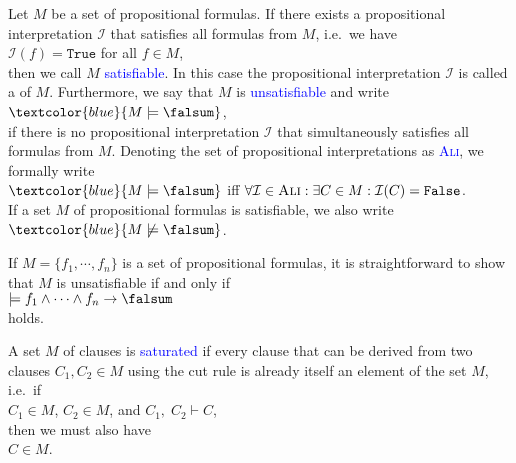 \begin{Definition}[Satisfiability]  \hspace*{\fill} \linebreak
  Let $M$ be a set of propositional formulas.
  If there exists a propositional interpretation $\mathcal{I}$ that satisfies all formulas from $M$, i.e.~we have
  \\[0.2cm]
  \hspace*{1.3cm}
  $\mathcal{I}(f) = \texttt{True}$ \quad for all $f \in M$,
  \\[0.2cm]
  then we call $M$ \textcolor{blue}{satisfiable}.  In this case the propositional
  interpretation $\mathcal{I}$ is called a  of $M$.
  Furthermore, we say that $M$ is \textcolor{blue}{unsatisfiable}
  and write 
  \\[0.2cm]
  \hspace*{1.3cm}
  $\textcolor{blue}{M \models \falsum}$, 
  \\[0.2cm]
  if there is no propositional interpretation $\mathcal{I}$ that simultaneously satisfies all formulas from $M$.
  Denoting the set of propositional interpretations as
  \textsc{\textcolor{blue}{Ali}}, we formally write
  \\[0.2cm]
  \hspace*{1.3cm}
  $\textcolor{blue}{M \models \falsum}$ \quad iff \quad 
  $\forall \mathcal{I} \in \textsc{Ali}: \exists C \in M: \mathcal{I}(C) = \texttt{False}$.
  \\[0.2cm]
  If a set $M$ of propositional formulas is satisfiable, we also write
  \\[0.2cm]
  \hspace*{1.3cm}
  $\textcolor{blue}{M \not\models \falsum}$.
  \eox
\end{Definition}

\remarkEng 
If $M = \{ f_1, \cdots, f_n \}$ is a set of propositional formulas, it is straightforward to show that
$M$ is unsatisfiable if and only if
\\[0.2cm]
\hspace*{1.3cm}
$\models f_1 \wedge \cdots \wedge f_n \rightarrow \falsum$
\\[0.2cm]
holds. \eox

\begin{Definition} \hspace*{\fill} \linebreak
  A set $M$ of clauses is \textcolor{blue}{saturated}  if every clause that can be derived from two
  clauses $C_1, C_2 \in M$ using the cut rule is already itself an element of
  the set $M$, i.e.~if
  \\[0.2cm]
  \hspace*{1.3cm}
  $C_1 \in M$, \quad $C_2 \in M$, \quad and \quad $C_1,\; C_2 \vdash C$,
  \\[0.2cm]
  then we must also have 
  \\[0.2cm]
  \hspace*{1.3cm}
  $C \in M$.
\end{Definition}
 
